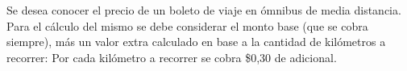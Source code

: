 Se desea conocer el precio de un boleto de viaje en ómnibus de media distancia. Para el cálculo del mismo se debe considerar el monto base (que se cobra siempre), más un valor extra calculado en base a la cantidad de kilómetros a recorrer:  Por cada kilómetro a recorrer se cobra \$0,30 de adicional.

